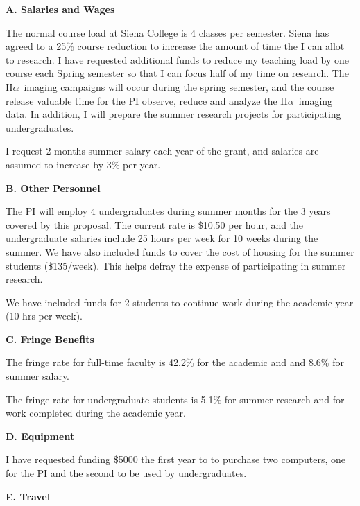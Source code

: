 \documentclass[preprint,11pt]{aastex}
\newcommand{\ha}{H$\alpha$}
\begin{document}
\begin{center}
{\bf \large A. Salaries and Wages}
\end{center}

The normal course load at Siena College is 4 classes per semester.  Siena
has agreed to a 25\% course reduction to increase the amount of time the 
I can allot to research.  I have requested additional funds to reduce
my teaching load by one course each Spring semester so that I can
focus half of my time on research.  The \ha \ imaging campaigns will
occur during the spring semester, and the course release valuable time for the PI observe, reduce and analyze
the \ha \ imaging data.  In addition, I will prepare the summer research
projects for participating undergraduates.  

I request 2 months summer salary each year of the grant, and 
salaries are assumed to increase by 3\% per year.

\begin{center}
{\bf \large B. Other Personnel}
\end{center}

The PI will employ 4 undergraduates during summer months
for the 3 years covered by this proposal.  The current rate is \$10.50
per hour, and the undergraduate salaries include 25 hours per week 
for 10 weeks during the summer.  
We have also included funds to cover the cost of housing for the
summer students (\$135/week).  This helps defray the expense of
participating in summer research.

We have included funds for 2 students to continue work during the
academic year (10 hrs per week).

\begin{center}
{\bf \large C. Fringe Benefits}
\end{center}

The fringe rate for full-time faculty 
is 42.2\% for the academic and and 8.6\% for summer salary.

The fringe rate for undergraduate students is 
5.1\% for summer research and for work completed during the
academic year.

\begin{center}
{\bf \large D. Equipment}
\end{center}

I have requested funding \$5000 the first year to 
to purchase two computers, one for the PI and the second to be used by undergraduates.  

\begin{center}
{\bf \large E. Travel}
\end{center}
\end{document}
